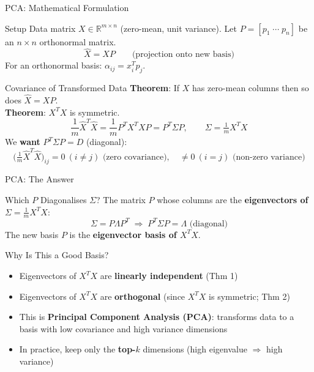 \documentclass{beamer}
\begin{document}
\begin{frame}[shrink=10]{PCA: Mathematical Formulation}
  \begin{block}{Setup}
    Data matrix $X\in\mathbb{R}^{m\times n}$ (zero-mean, unit variance).
    Let $P=[p_1\;\cdots\;p_n]$ be an $n\times n$ orthonormal matrix.
    \[
      \hat{X} = XP
      \qquad\text{(projection onto new basis)}
    \]
    For an orthonormal basis: $\alpha_{ij} = x_i^T p_j$.
  \end{block}

  \medskip

  \begin{block}{Covariance of Transformed Data}
    \textbf{Theorem}: If $X$ has zero-mean columns then so does
    $\hat{X}=XP$.\\[4pt]
    \textbf{Theorem}: $X^TX$ is symmetric.\\[6pt]
    \[
      \frac{1}{m}\hat{X}^T\hat{X}
        = \frac{1}{m}P^T X^T X P
        = P^T\Sigma P,
      \qquad
      \Sigma = \tfrac{1}{m}X^TX
    \]
    We \textbf{want} $P^T\Sigma P = D$ (diagonal):
    \[
      \bigl(\tfrac{1}{m}\hat{X}^T\hat{X}\bigr)_{ij}
        = 0\ (i\neq j)
        \text{ (zero covariance)},\quad
      \neq 0\ (i=j)
      \text{ (non-zero variance)}
    \]
  \end{block}
\end{frame}

\begin{frame}[shrink=10]{PCA: The Answer}
  \begin{block}{Which $P$ Diagonalises $\Sigma$?}
    The matrix $P$ whose columns are the
    \textbf{eigenvectors of $\Sigma = \frac{1}{m}X^TX$}:
    \[
      \Sigma = P\Lambda P^T
      \;\Rightarrow\;
      P^T\Sigma P = \Lambda\text{ (diagonal)}
    \]
    The new basis $P$ is the \textbf{eigenvector basis of $X^TX$}.
  \end{block}

  \medskip

  \begin{block}{Why Is This a Good Basis?}
    \begin{itemize}\setlength\itemsep{5pt}
      \item Eigenvectors of $X^TX$ are \textbf{linearly independent}
            (Thm 1)
      \item Eigenvectors of $X^TX$ are \textbf{orthogonal}
            (since $X^TX$ is symmetric; Thm 2)
      \item This is \textbf{Principal Component Analysis (PCA)}:
            transforms data to a basis with low covariance and high
            variance dimensions
      \item In practice, keep only the \textbf{top-$k$} dimensions
            (high eigenvalue $\Rightarrow$ high variance)
    \end{itemize}
  \end{block}
\end{frame}
\end{document}
